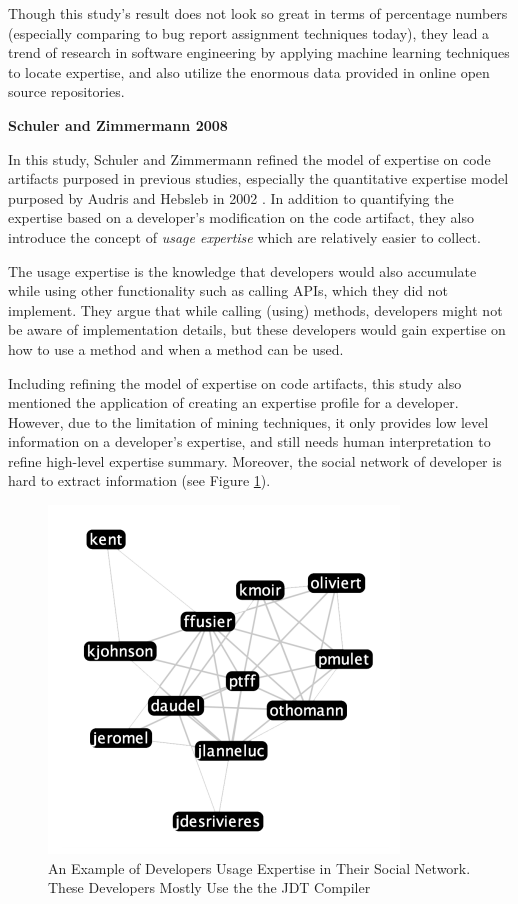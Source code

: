 Though this study's result does not look so great in terms of percentage numbers (especially comparing to bug report assignment techniques today), they lead a trend of research in software engineering by applying machine learning techniques to locate expertise, and also utilize the enormous data provided in online open source repositories.

\textbf{Schuler and Zimmermann 2008}

In this study, Schuler and Zimmermann refined the model of expertise on code artifacts purposed in previous studies, especially the quantitative expertise model purposed by Audris and Hebsleb in 2002 \cite{mockus2002expertise}. In addition to quantifying the expertise based on a developer's modification on the code artifact, they also introduce the concept of \textit{usage expertise} which are relatively easier to collect.

The usage expertise is the knowledge that developers would also accumulate while using other functionality such as calling APIs, which they did not implement. They argue that while calling (using) methods, developers might not be aware of implementation details, but these developers would gain expertise on how to use a method and when a method can be used.

Including refining the model of expertise on code artifacts, this study also mentioned the application of creating an expertise profile for a developer. However, due to the limitation of mining techniques, it only provides low level information on a developer's expertise, and still needs human interpretation to refine high-level expertise summary. Moreover, the social network of developer is hard to extract information (see Figure \ref{usage}).

\begin{figure}
\includegraphics[width = 0.4\columnwidth]{usageExpertise.png}
\centering
\caption{An Example of Developers Usage Expertise in Their Social Network. These Developers Mostly Use the the JDT Compiler \cite{schuler2008mining}}
\label{usage}
\end{figure}

